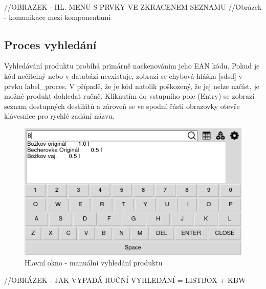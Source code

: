 //OBRAZEK - HL. MENU S PRVKY VE ZKRACENEM SEZNAMU
//Obrázek - komunikace mezi komponentami

\subsection{Proces vyhledání}




Vyhledávání produktu probíhá primárně naskenováním jeho EAN kódu. Pokud je kód nečitelný nebo v databázi neexistuje, zobrazí se chybová hláška [sdsd] v prvku label\_proces. V případě, že je kód natolik poškozený, že jej nelze načíst, je možné produkt dohledat ručně. Kliknutím do vstupního pole (Entry) se zobrazí seznam dostupných destilátů a zároveň se ve spodní části obrazovky otevře klávesnice pro rychlé zadání názvu.

\begin{figure}[H]
    \begin{center}
        \includegraphics[scale=0.4]{obrazky/GUI Klavesnice + list_box + filr.png}
    \end{center}
    \caption{Hlavní okno - manuální vyhledání produktu}
    \label{Hlavní okno - manuální vyhledání produktu}
\end{figure}
//OBRÁZEK - JAK VYPADÁ RUČNÍ VYHLEDÁNÍ = LISTBOX + KBW

